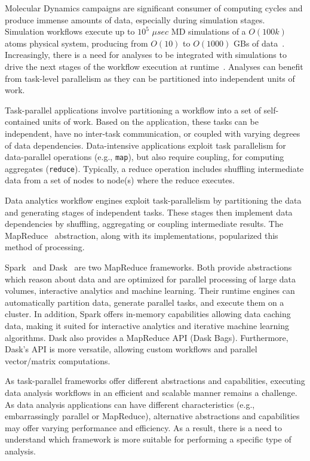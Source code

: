 \label{ch:task-par}

Molecular Dynamics campaigns are significant consumer of computing cycles and
produce immense amounts of data, especially during simulation stages. Simulation
workflows execute up to $10^5$ $\mu sec$ MD simulations of a $O(100k)$ atoms
physical system, producing from $O(10)$ to $O(1000)$ GBs of
data~\cite{cheatham2015impact}. Increasingly, there is a need for analyses to be
integrated with simulations to drive the next stages of the workflow execution
at runtime~\cite{balasubramanian2016extasy}. Analyses can benefit from
task-level parallelism as they can be partitioned into independent units of
work.

Task-parallel applications involve partitioning a workflow into a set of
self-contained units of work. Based on the application, these tasks can be
independent, have no inter-task communication, or coupled with varying degrees
of data dependencies. Data-intensive applications exploit task parallelism for
data-parallel operations (e.g., \texttt{map}), but also require coupling, for
computing aggregates (\texttt{reduce}). Typically, a reduce operation includes
shuffling intermediate data from a set of nodes to node(s) where the reduce
executes.

Data analytics workflow engines exploit task-parallelism by partitioning the
data and generating stages of independent tasks. These stages then implement
data dependencies by shuffling, aggregating or coupling intermediate results.
The MapReduce~\cite{dean2004mapreduce} abstraction, along with its
implementations, popularized this method of processing.

Spark~\cite{zaharia2010spark} and Dask~\cite{rocklin2015dask} are two MapReduce
frameworks. Both provide abstractions which reason about data and are optimized
for parallel processing of large data volumes, interactive analytics and machine
learning. Their runtime engines can automatically partition data, generate
parallel tasks, and execute them on a cluster. In addition, Spark offers
in-memory capabilities allowing data caching data, making it suited for
interactive analytics and iterative machine learning algorithms. Dask also
provides a MapReduce API (Dask Bags). Furthermore, Dask's API is more versatile,
allowing custom workflows and parallel vector/matrix computations.

As task-parallel frameworks offer different abstractions and capabilities,
executing data analysis workflows in an efficient and scalable manner remains a
challenge. As data analysis applications can have different characteristics
(e.g., embarrassingly parallel or MapReduce), alternative abstractions and
capabilities may offer varying performance and efficiency. As a result, there is
a need to understand which framework is more suitable for performing a specific
type of analysis.

